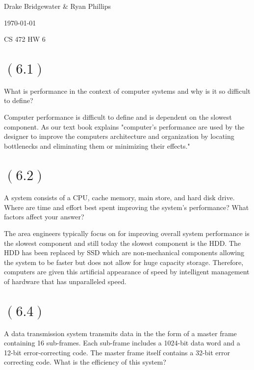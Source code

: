 \documentclass[letterpaper,12pt,titlepage]{article}
\def\name{Drake Bridgewater \& Ryan Phillips}
\begin{document}
\hfill \name

\hfill \today

\hfill CS 472 HW 6

\section*{$(6.1)$} What is performance in the context of computer systems and why is it so difficult to define?

\begin{mdframed}[style=MyFrame]
Computer performance is difficult to define and is dependent on the slowest component. As our text book explains "computer's performance are used by the designer to improve the computers architecture and organization by locating bottlenecks and eliminating them or minimizing their effects." \cite{Clements}
\end{mdframed}

\section*{$(6.2)$} A system consists of a CPU, cache memory, main store, and hard disk drive. Where are time and effort best spent improving the system's performance? What factors affect your answer?

\begin{mdframed}[style=MyFrame]

The area engineers typically focus on for improving overall system performance is the slowest component and still today the slowest component is the HDD. The HDD has been replaced by SSD which are non-mechanical components allowing the system to be faster but does not allow for huge capacity storage. Therefore, computers are given this artificial appearance of speed by intelligent management of hardware that has unparalleled speed.

\end{mdframed}

\section*{$(6.4)$} A data transmission system transmits data in the the form of a master frame containing 16 sub-frames. Each sub-frame includes a 1024-bit data word and a 12-bit error-correcting code. The master frame itself contains a 32-bit error correcting code. What is the efficiency of this system?

\begin{mdframed}[style=MyFrame]
\end{mdframed}
\end{document}
